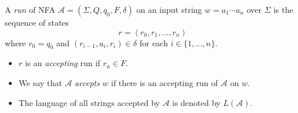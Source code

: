 \begin{definition}\label{def:nfa-run}
  A \emph{run} of NFA $\mathcal{A} = (\Sigma, Q, q_0, F, \delta)$ on an input
  string $w = a_1 \cdots a_n$ over $\Sigma$ is the sequence of states
  \begin{equation*}
    r = (r_0, r_1, \dots, r_n)
  \end{equation*}
  where $r_0 = q_0$ and $(r_{i-1}, a_i, r_i) \in \delta$ for each
  $i \in \{1, \dots, n\}$.
  \begin{itemize}
    \item $r$ is an \emph{accepting} run if $r_n \in F$.
    \item We say that $\mathcal{A}$ \emph{accepts} $w$ if there is an accepting
      run of $\mathcal{A}$ on $w$.
    \item The language of all strings accepted by $\mathcal{A}$ is denoted by
      $L(\mathcal{A})$.
  \end{itemize}
\end{definition}

